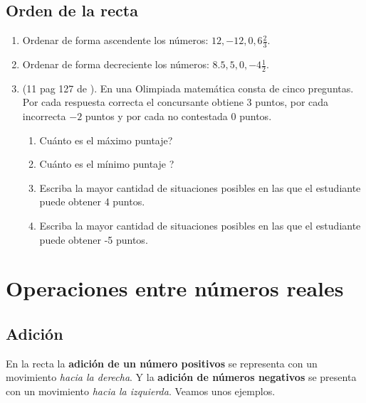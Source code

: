 \newpage
\begin{center}
	\vspace{-1cm}
	\subsection{ Orden de la recta}\label{ejercicios_subsubsection_orden_de_la_recta}
\end{center}
\begin{enumerate}
		\item Ordenar de forma ascendente los números: $12,-12,0,6\frac{2}{3}$.
		\item Ordenar de forma decreciente los números: $8.5,5,0,-4\frac{1}{2}$.
		\item (11 pag 127 de \cite{Dimensions_Math_6A}). En una Olimpiada matemática consta de cinco preguntas. Por cada respuesta correcta el concursante obtiene 3 puntos, por cada incorrecta $-2$ puntos y por cada no contestada $0$ puntos.
				\begin{enumerate}[label=\Alph*)]
						\item Cuánto es el máximo puntaje?
						\item Cuánto es el mínimo puntaje ?
						\item Escriba la mayor cantidad de situaciones posibles en las que el estudiante puede obtener 4 puntos.
						\item Escriba la mayor cantidad de situaciones posibles en las que el estudiante puede obtener -5 puntos.
				\end{enumerate}
\end{enumerate} 
\newpage

\section{Operaciones entre números reales}\label{subsubsection_operaciones_entre_numeros_reales}

\subsection{Adición}\label{subsubsubsection_adicion_numeros_reales}

En la recta la \textbf{adición de un número positivos} se representa con un movimiento \textit{hacia la derecha}. Y la \textbf{adición de números negativos} se presenta con un movimiento \textit{hacia la izquierda}. Veamos unos ejemplos.

